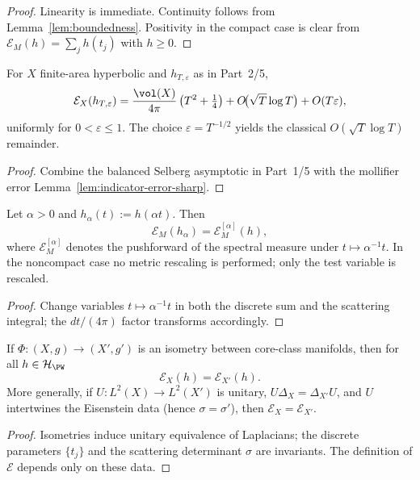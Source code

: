 \begin{proof}
Linearity is immediate. Continuity follows from Lemma~\ref{lem:boundedness}. Positivity in the compact case is clear from $\mathcal E_M(h)=\sum_j h(t_j)$ with $h\ge0$.
\end{proof}

\begin{theorem}
\label{thm:balanced-selberg-functional}
For $X$ finite-area hyperbolic and $h_{T,\varepsilon}$ as in Part~2/5,
\[
  \mathcal E_X(h_{T,\varepsilon})
  = \frac{\vol(X)}{4\pi}\,\big(T^2+\tfrac14\big)
    + O\!\big(\sqrt{T}\log T\big) + O(T\varepsilon),
\]
uniformly for $0<\varepsilon\le1$. The choice $\varepsilon=T^{-1/2}$ yields the classical $O(\sqrt{T}\log T)$ remainder.
\end{theorem}

\begin{proof}
Combine the balanced Selberg asymptotic in Part~1/5 with the mollifier error Lemma~\ref{lem:indicator-error-sharp}.
\end{proof}

\begin{theorem}
\label{thm:spectral-rescaling}
Let $\alpha>0$ and $h_\alpha(t):=h(\alpha t)$. Then
\[
  \mathcal E_M(h_\alpha)=\mathcal E_M^{[\alpha]}(h),
\]
where $\mathcal E_M^{[\alpha]}$ denotes the pushforward of the spectral measure under $t\mapsto \alpha^{-1}t$. In the noncompact case no metric rescaling is performed; only the test variable is rescaled.
\end{theorem}

\begin{proof}
Change variables $t\mapsto \alpha^{-1}t$ in both the discrete sum and the scattering integral; the $dt/(4\pi)$ factor transforms accordingly.
\end{proof}

\begin{proposition}
\label{prop:isometry-invariance}
If $\Phi:(X,g)\to (X',g')$ is an isometry between core-class manifolds, then for all $h\in\mathcal H_{\PW}$
\[
 \mathcal E_X(h)=\mathcal E_{X'}(h).
\]
More generally, if $U:L^2(X)\to L^2(X')$ is unitary, $U\Delta_X=\Delta_{X'}U$, and $U$ intertwines the Eisenstein data (hence $\sigma=\sigma'$), then $\mathcal E_X=\mathcal E_{X'}$.
\end{proposition}

\begin{proof}
Isometries induce unitary equivalence of Laplacians; the discrete parameters $\{t_j\}$ and the scattering determinant $\sigma$ are invariants. The definition of $\mathcal E$ depends only on these data.
\end{proof}

